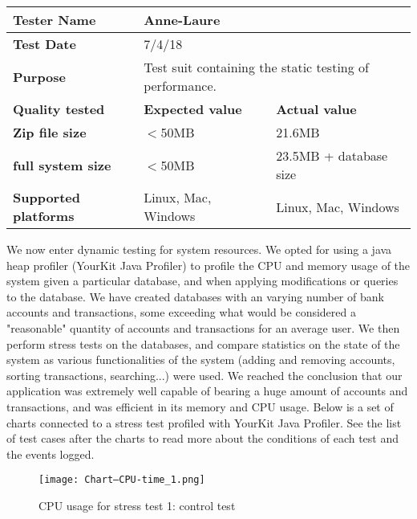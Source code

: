 \documentclass[12pt]{article}
\begin{document}
\begin{longtable}{|m{4cm}|m{6cm}|l|}
\hline
\cellcolor[HTML]{C0C0C0}\textbf{Tester Name} & \multicolumn{2}{p{13cm}|}{Anne-Laure}\\ \hline
\cellcolor[HTML]{C0C0C0}\textbf{Test Date} & \multicolumn{2}{p{13cm}|}{7/4/18}\\ \hline
\cellcolor[HTML]{C0C0C0}\textbf{Purpose} & \multicolumn{2}{p{13cm}|}{Test suit containing the static testing of performance.}\\ \hline
\cellcolor[HTML]{C0C0C0}\textbf{Quality tested} & \cellcolor[HTML]{C0C0C0}\textbf{Expected value} & \cellcolor[HTML]{C0C0C0}\textbf{Actual value}\\ \hline
\cellcolor[HTML]{C0C0C0}\textbf{Zip file size} & $<$50MB & 21.6MB \\ \hline
 \cellcolor[HTML]{C0C0C0}\textbf{full system size} & $<$50MB & 23.5MB + database size \\ \hline
 \cellcolor[HTML]{C0C0C0}\textbf{Supported platforms} & Linux, Mac, Windows & Linux, Mac, Windows\\ \hline
\end{longtable}

We now enter dynamic testing for system resources. We opted for using a java heap profiler (YourKit Java Profiler) to profile the CPU and memory usage of the system given a particular database, and when applying modifications or queries to the database. We have created databases with an varying number of bank accounts and transactions, some exceeding what would be considered a "reasonable" quantity of accounts and transactions for an average user. We then perform stress tests on the databases, and compare statistics on the state of the system as various functionalities of the system (adding and removing accounts, sorting transactions, searching...) were used. We reached the conclusion that our application was extremely well capable of bearing a huge amount of accounts and transactions, and was efficient in its memory and CPU usage.
Below is a set of charts connected to a stress test profiled with YourKit Java Profiler. See the list of test cases after the charts to read more about the conditions of each test and the events logged.

\begin{figure}[htbp]
    \texttt{[image: Chart--CPU-time\_1.png]}
    \caption{CPU usage for stress test 1: control test}
    \label{fig:CPU1}
\end{figure}
\end{document}
